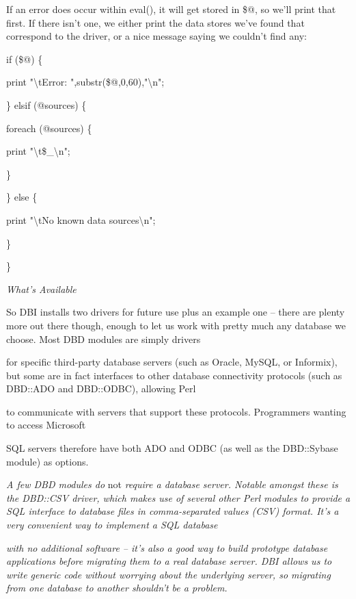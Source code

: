 \documentclass[a4paper,11pt]{book}
\begin{document}
\noindent 

\noindent If an error does occur within eval(), it will get stored in \$@, so we'll print that first. If there isn't one, we either print the data stores we've found that correspond to the driver, or a nice message saying we couldn't find any:

\noindent 

\noindent if (\$@) \{

\noindent print "\textbackslash tError: ",substr(\$@,0,60),"\textbackslash n";

\noindent \} elsif (@sources) \{

\noindent foreach (@sources) \{

\noindent print "\textbackslash t\$\_\textbackslash n";

\noindent \}

\noindent \} else \{

\noindent print "\textbackslash tNo known data sources\textbackslash n";

\noindent \}

\noindent \}

\noindent 

\noindent \textit{What's Available}

\noindent So DBI installs two drivers for future use plus an example one -- there are plenty more out there though, enough to let us work with pretty much any database we choose. Most DBD modules are simply drivers

\noindent for specific third-party database servers (such as Oracle, MySQL, or Informix), but some are in fact interfaces to other database connectivity protocols (such as DBD::ADO and DBD::ODBC), allowing Perl

\noindent to communicate with servers that support these protocols. Programmers wanting to access Microsoft

\noindent SQL servers therefore have both ADO and ODBC (as well as the DBD::Sybase module) as options.

\noindent 

\noindent \textit{A few DBD modules do }not \textit{require a database server. Notable amongst these is the DBD::CSV driver, which makes use of several other Perl modules to provide a SQL interface to database files in comma-separated values (CSV) format. It's a very convenient way to implement a SQL database}

\noindent \textit{with no additional software -- it's also a good way to build prototype database applications before migrating them to a real database server. DBI allows us to write generic code without worrying about the underlying server, so migrating from one database to another shouldn't be a problem.}
\end{document}

